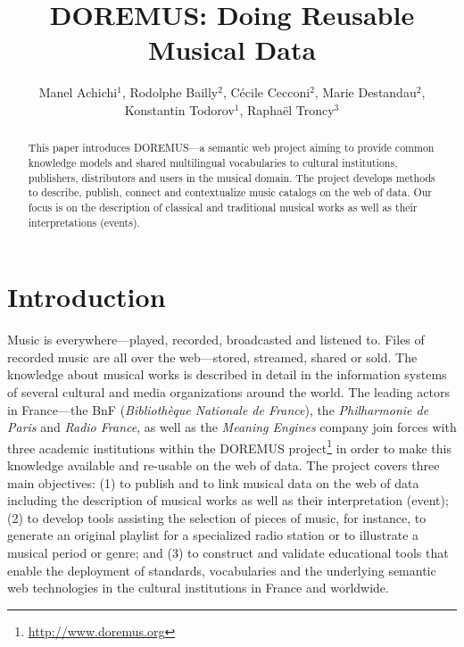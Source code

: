 \documentclass{llncs}
\begin{document}
\title{DOREMUS: Doing Reusable Musical Data}

\author{Manel Achichi$^1$, Rodolphe Bailly$^2$, C\'{e}cile Cecconi$^2$, Marie Destandau$^2$, Konstantin Todorov$^1$, Rapha\"{e}l Troncy$^3$}

\maketitle


\begin{abstract}
This paper introduces DOREMUS---a semantic web project aiming to provide common knowledge models and shared multilingual vocabularies to cultural institutions, publishers, distributors and users in the musical domain. The project develops methods to describe, publish, connect and contextualize music catalogs on the web of data. Our focus is on the description of classical and traditional musical works as well as their interpretations (events).
\end{abstract}


\section{Introduction}
\label{sec:introduction}
Music is everywhere---played,  recorded, broadcasted and listened to. Files of recorded music are all over the web---stored, streamed, shared or sold. The knowledge about musical works is described in detail in the information systems of several cultural and media organizations around the world. The leading actors in France---the  BnF (\textit{Biblioth\`eque Nationale de France}), the \textit{Philharmonie de Paris} and \textit{Radio France}, as well as the \textit{Meaning Engines} company join forces with three academic institutions within the DOREMUS project\footnote{\url{http://www.doremus.org}} in order to make this knowledge available and re-usable on the web of data. The project covers three main objectives: (1) to publish and to link musical data on the web of data including the description of musical works as well as their interpretation (event); (2) to develop tools assisting the selection of pieces of music, for instance, to generate an original playlist for a specialized radio station or to illustrate a musical period or genre; and (3) to construct and validate educational tools that enable the deployment of standards, vocabularies and the underlying semantic web technologies in the cultural institutions in France and worldwide.
\end{document}
